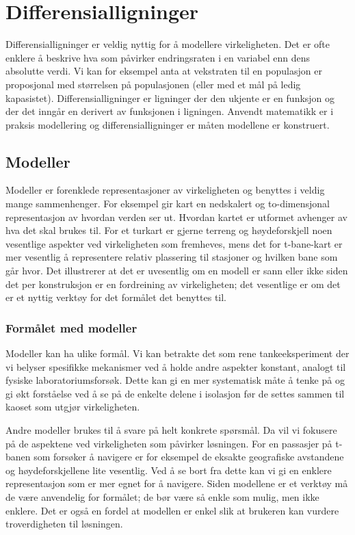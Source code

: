 \chapter{Differensialligninger}
Differensialligninger er veldig nyttig for å modellere virkeligheten. Det er ofte enklere å beskrive hva som påvirker endringsraten i en variabel enn dens absolutte verdi. Vi kan for eksempel anta at vekstraten til en populasjon er proposjonal med størrelsen på populasjonen (eller med et mål på ledig kapasistet). Differensialligninger er ligninger der den ukjente er en funksjon og der det inngår en derivert av funksjonen i ligningen. Anvendt matematikk er i praksis modellering og differensialligninger er måten modellene er konstruert.
\section{Modeller}
Modeller er forenklede representasjoner av virkeligheten og benyttes i veldig mange sammenhenger. For eksempel gir kart en nedskalert og to-dimensjonal representasjon av hvordan verden ser ut. Hvordan kartet er utformet avhenger av hva det skal brukes til. For et turkart er gjerne terreng og høydeforskjell noen vesentlige aspekter ved virkeligheten som fremheves, mens det for t-bane-kart er mer vesentlig å representere relativ plassering til stasjoner og hvilken bane som går hvor. Det illustrerer at det er uvesentlig om en modell er sann eller ikke siden det per konstruksjon er en fordreining av virkeligheten; det vesentlige er om det er et nyttig verktøy for det formålet det benyttes til. 
\subsection{Formålet med modeller}
Modeller kan ha ulike formål. Vi kan betrakte det som rene tankeeksperiment der vi belyser spesifikke mekanismer ved å holde andre aspekter konstant, analogt til fysiske laboratoriumsforsøk. Dette kan gi en mer systematisk måte å tenke på og gi økt forståelse ved å se på de enkelte delene i isolasjon før de settes sammen til kaoset som utgjør virkeligheten.

Andre modeller brukes til å svare på helt konkrete spørsmål. Da vil vi fokusere på de aspektene ved virkeligheten som påvirker løsningen. For en passasjer på t-banen som forsøker å navigere er for eksempel de eksakte geografiske avstandene og høydeforskjellene lite vesentlig. Ved å se bort fra dette kan vi gi en enklere representasjon som er mer egnet for å navigere. Siden modellene er et verktøy må de være anvendelig for formålet; de bør være så enkle som mulig, men ikke enklere. Det er også en fordel at modellen er enkel slik at brukeren kan vurdere troverdigheten til løsningen.
